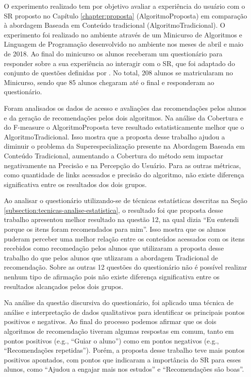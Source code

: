 O experimento realizado tem por objetivo avaliar a experiência do usuário com o SR proposto no Capítulo \ref{chapter:proposta}
(AlgoritmoProposta) em comparação à abordagem Baseada em Conteúdo tradicional (AlgoritmoTradicional). O experimento foi
realizado no ambiente \adaptwebspace através de um Minicurso de Algoritmos e Linguagem de Programação desenvolvido no
ambiente nos meses de abril e maio de 2018. Ao final do minicurso os alunos receberam um questionário para responder
sobre a sua experiência ao interagir com o SR, que foi adaptado do conjunto de questões definidas por
. No total, 208 alunos se matricularam no Minicurso, sendo que 85 alunos chegaram até o final e
responderam ao questionário.

Foram analisados os dados de acesso e avaliações das recomendações pelos alunos e da geração de recomendações pelos dois
algoritmos. Na análise da Cobertura e do F-measure o AlgoritmoProposta teve resultado estatisticamente melhor que
o AlgoritmoTradicional. Isso mostra que a proposta desse trabalho ajudou a diminuir o problema da Superespecialização
presente na Abordagem Baseada em Conteúdo Tradicional, aumentando a Cobertura do método sem impactar negativamente na
Precisão e na  Percepção do Usuário. Para as outras métricas, como quantidade de links acessados e precisão do
algoritmo, não existe diferença significativa entre os resultados dos dois grupos.

Ao analisar o questionário utilizando-se de técnicas estatísticas descritas na Seção \ref{subsection:tecnicas-analise-estatistica},
o resultado foi que proposta desse trabalho apresentou melhor resultado na questão 12, na qual dizia
``Eu entendi porque os itens foram recomendados para mim''. Isso mostra que os alunos puderam perceber uma melhor relação
entre os conteúdos acessados com os itens recebidos como recomedação pelos alunos que utilizaram a proposta desse trabalho
do que pelos alunos que utlizaram a abordagem Tradicional de recomendação. Sobre as outras 12 questões do questionário
não é possível realizar nenhum tipo de afirmação pois não existe diferença significativa entre os resultados
alcançados pelos dois grupos.

Na análise da questão discursiva do questionário, foi aplicado uma técnica de análise e interpretação de dados qualitativos
para identificar os principais pontos positivos e negativos. Ao final do processo podemos afirmar que os dois algoritmos
de recomendação tiveram algumas respostas em comum, tanto em pontos positivos (e.g., ``Guiar o aluno'') como em pontos
negativos (e.g., ``Recomendações repetidas''). Porém, a proposta desse trabalho teve mais pontos positivos apontados,
com pontos que indicaram a importância do SR para esses alunos, como ``Ajudou a engajar mais nos estudos'' e
``Recomendações são boas''.

